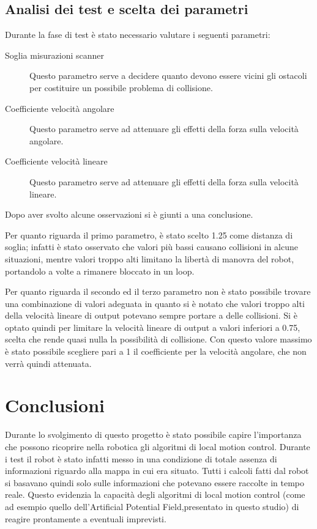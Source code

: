\documentclass[Lau, binding=0.6cm, oneside]{sapthesis}
\begin{document}
\section{Analisi dei test e scelta dei parametri}
Durante la fase di test è stato necessario valutare i seguenti parametri:
\begin{description}
    \item[Soglia misurazioni scanner] Questo parametro serve a decidere quanto devono essere vicini gli ostacoli per costituire un possibile problema di collisione.
    \item[Coefficiente velocità angolare] Questo parametro serve ad attenuare gli effetti della forza sulla velocità angolare.
    \item[Coefficiente velocità lineare] Questo parametro serve ad attenuare gli effetti della forza sulla velocità lineare.
\end{description}
Dopo aver svolto alcune osservazioni si è giunti a una conclusione.

Per quanto riguarda il primo parametro, è stato scelto 1.25 come distanza di soglia; infatti è stato osservato che valori più bassi causano collisioni in alcune situazioni, mentre valori troppo alti limitano la libertà di manovra del robot, portandolo a volte a rimanere bloccato in un loop.

Per quanto riguarda il secondo ed il terzo parametro non è stato possibile trovare una combinazione di valori adeguata in quanto si è notato che valori troppo alti della velocità lineare di output potevano sempre portare a delle collisioni.
Si è optato quindi per limitare la velocità lineare di output a valori inferiori a 0.75, scelta che rende quasi nulla la possibilità di collisione.
Con questo valore massimo è stato possibile scegliere pari a 1 il coefficiente per la velocità angolare, che non verrà quindi attenuata.

\chapter{Conclusioni}
Durante lo svolgimento di questo progetto è stato possibile capire l'importanza che possono ricoprire nella robotica gli algoritmi di local motion control.
Durante i test il robot è stato infatti messo in una condizione di totale assenza di informazioni riguardo alla mappa in cui era situato.
Tutti i calcoli fatti dal robot si basavano quindi solo sulle informazioni che potevano essere raccolte in tempo reale.
Questo evidenzia la capacità degli algoritmi di local motion control (come ad esempio quello dell'Artificial Potential Field,presentato in questo studio) di reagire prontamente a eventuali imprevisti.
\end{document}
